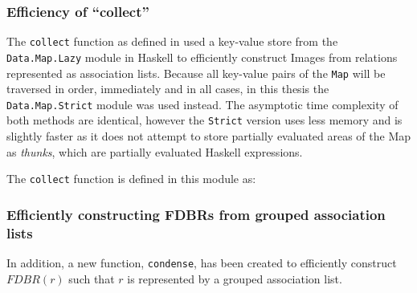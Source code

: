 \documentclass[../main.tex]{subfiles}
\begin{document}
\subsubsection{Efficiency of ``collect''}

\label{subsubsection:collect}
The \texttt{collect} function as defined in \cite{agboola2015extensible} used a key-value store from the \texttt{Data.Map.Lazy} module in Haskell to efficiently construct Images from relations represented as association lists.  Because all key-value pairs of the \texttt{Map} will be traversed in order, immediately and in all cases, in this thesis the \texttt{Data.Map.Strict} module was used instead.  The asymptotic time complexity of both methods are identical, however the \texttt{Strict} version uses less memory and is slightly faster as it does not attempt to store partially evaluated areas of the Map as {\em thunks}, which are partially evaluated Haskell expressions.

The \texttt{collect} function is defined in this module as:







\subsubsection{Efficiently constructing FDBRs from grouped association lists}
In addition, a new function, \texttt{condense}, has been created to efficiently construct $FDBR(r)$ such that $r$ is represented by a grouped association list.
\end{document}
